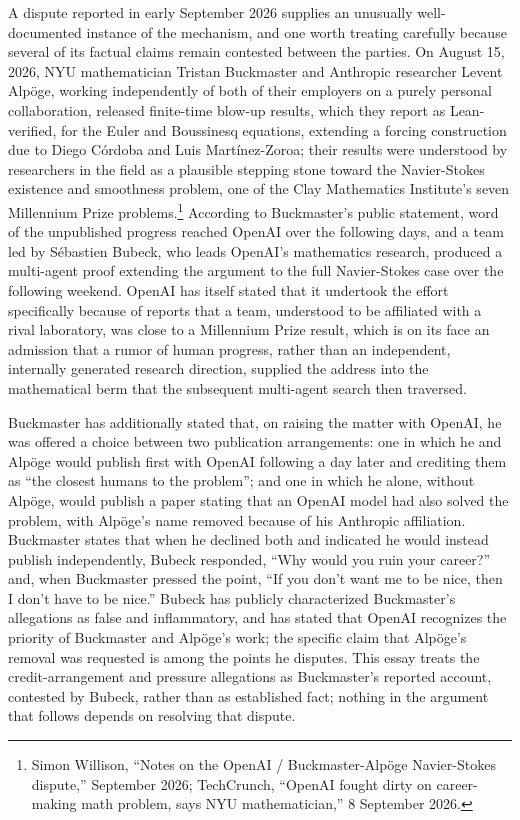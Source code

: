 \documentclass[11pt]{article}
\begin{document}
A dispute reported in early September 2026 supplies an unusually well-documented instance of the mechanism, and one worth treating carefully because several of its factual claims remain contested between the parties. On August 15, 2026, NYU mathematician Tristan Buckmaster and Anthropic researcher Levent Alpöge, working independently of both of their employers on a purely personal collaboration, released finite-time blow-up results, which they report as Lean-verified, for the Euler and Boussinesq equations, extending a forcing construction due to Diego C\'{o}rdoba and Luis Mart\'{i}nez-Zoroa; their results were understood by researchers in the field as a plausible stepping stone toward the Navier-Stokes existence and smoothness problem, one of the Clay Mathematics Institute's seven Millennium Prize problems.\footnote{Simon Willison, ``Notes on the OpenAI / Buckmaster-Alp\"{o}ge Navier-Stokes dispute,'' September 2026; TechCrunch, ``OpenAI fought dirty on career-making math problem, says NYU mathematician,'' 8 September 2026.} According to Buckmaster's public statement, word of the unpublished progress reached OpenAI over the following days, and a team led by S\'{e}bastien Bubeck, who leads OpenAI's mathematics research, produced a multi-agent proof extending the argument to the full Navier-Stokes case over the following weekend. OpenAI has itself stated that it undertook the effort specifically because of reports that a team, understood to be affiliated with a rival laboratory, was close to a Millennium Prize result, which is on its face an admission that a rumor of human progress, rather than an independent, internally generated research direction, supplied the address into the mathematical berm that the subsequent multi-agent search then traversed.

Buckmaster has additionally stated that, on raising the matter with OpenAI, he was offered a choice between two publication arrangements: one in which he and Alp\"{o}ge would publish first with OpenAI following a day later and crediting them as ``the closest humans to the problem''; and one in which he alone, without Alp\"{o}ge, would publish a paper stating that an OpenAI model had also solved the problem, with Alp\"{o}ge's name removed because of his Anthropic affiliation. Buckmaster states that when he declined both and indicated he would instead publish independently, Bubeck responded, ``Why would you ruin your career?'' and, when Buckmaster pressed the point, ``If you don't want me to be nice, then I don't have to be nice.'' Bubeck has publicly characterized Buckmaster's allegations as false and inflammatory, and has stated that OpenAI recognizes the priority of Buckmaster and Alp\"{o}ge's work; the specific claim that Alp\"{o}ge's removal was requested is among the points he disputes. This essay treats the credit-arrangement and pressure allegations as Buckmaster's reported account, contested by Bubeck, rather than as established fact; nothing in the argument that follows depends on resolving that dispute.
\end{document}
